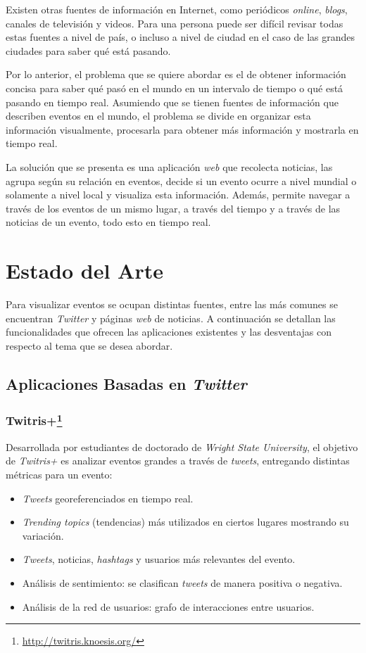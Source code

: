 \documentclass[10pt]{article}
\begin{document}
Existen otras fuentes de información en Internet, como periódicos \emph{online}, \emph{blogs}, canales de televisión y videos. Para una persona puede ser difícil revisar todas estas fuentes a nivel de país, o incluso a nivel de ciudad en el caso de las grandes ciudades para saber qué está pasando.

Por lo anterior, el problema que se quiere abordar es el de obtener información concisa para saber qué pasó en el mundo en un intervalo de tiempo o qué está pasando en tiempo real. Asumiendo que se tienen fuentes de información que describen eventos en el mundo, el problema se divide en organizar esta información visualmente, procesarla para obtener más información y mostrarla en tiempo real.

La solución que se presenta es una aplicación \emph{web} que recolecta noticias, las agrupa según su relación en eventos, decide si un evento ocurre a nivel mundial o solamente a nivel local y visualiza esta información. Además, permite navegar a través de los eventos de un mismo lugar, a través del tiempo y a través de las noticias de un evento, todo esto en tiempo real.

\section{Estado del Arte}

Para visualizar eventos se ocupan distintas fuentes, entre las más comunes se encuentran \emph{Twitter} y páginas \emph{web} de noticias. A continuación se detallan las funcionalidades que ofrecen las aplicaciones existentes y las desventajas con respecto al tema que se desea abordar.

\subsection{Aplicaciones Basadas en \emph{Twitter}}

\subsubsection*{Twitris+\footnote{\url{http://twitris.knoesis.org/}}}

Desarrollada por estudiantes de doctorado de \emph{Wright State University}, el objetivo de \emph{Twitris+}\cite{twitris} es analizar eventos grandes a través de \emph{tweets}, entregando distintas métricas para un evento: 

\begin{itemize}
	\item \emph{Tweets} georeferenciados en tiempo real.
	\item \emph{Trending topics} (tendencias) más utilizados en ciertos lugares mostrando su variación.
	\item \emph{Tweets}, noticias, \emph{hashtags} y usuarios más relevantes del evento.
	\item Análisis de sentimiento: se clasifican \emph{tweets} de manera positiva o negativa.
	\item Análisis de la red de usuarios: grafo de interacciones entre usuarios.
\end{itemize}
\end{document}
